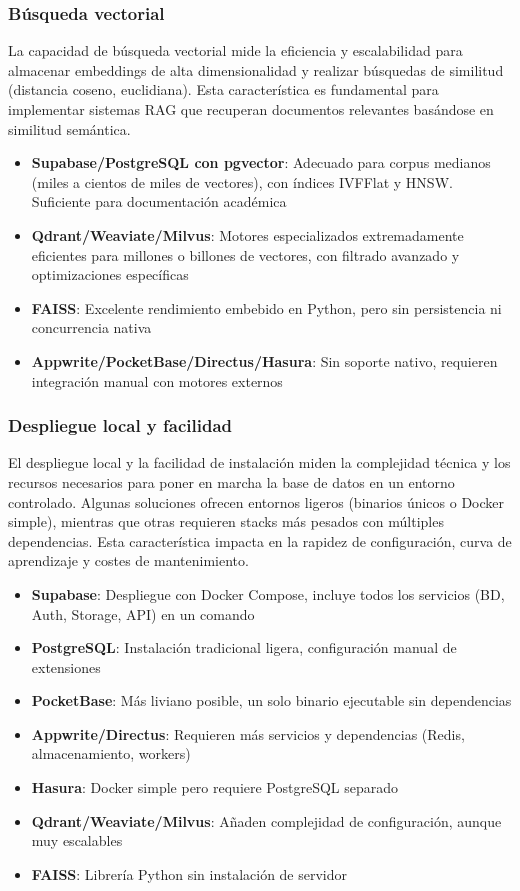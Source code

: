 \subsubsection{Búsqueda vectorial}

La capacidad de búsqueda vectorial mide la eficiencia y escalabilidad para almacenar embeddings de alta dimensionalidad y realizar búsquedas de similitud (distancia coseno, euclidiana). Esta característica es fundamental para implementar sistemas RAG que recuperan documentos relevantes basándose en similitud semántica.

\begin{itemize}
    \item \textbf{Supabase/PostgreSQL con pgvector}: Adecuado para corpus medianos (miles a cientos de miles de vectores), con índices IVFFlat y HNSW. Suficiente para documentación académica
    \item \textbf{Qdrant/Weaviate/Milvus}: Motores especializados extremadamente eficientes para millones o billones de vectores, con filtrado avanzado y optimizaciones específicas
    \item \textbf{FAISS}: Excelente rendimiento embebido en Python, pero sin persistencia ni concurrencia nativa
    \item \textbf{Appwrite/PocketBase/Directus/Hasura}: Sin soporte nativo, requieren integración manual con motores externos
\end{itemize}

\subsubsection{Despliegue local y facilidad}

El despliegue local y la facilidad de instalación miden la complejidad técnica y los recursos necesarios para poner en marcha la base de datos en un entorno controlado. Algunas soluciones ofrecen entornos ligeros (binarios únicos o Docker simple), mientras que otras requieren stacks más pesados con múltiples dependencias. Esta característica impacta en la rapidez de configuración, curva de aprendizaje y costes de mantenimiento.

\begin{itemize}
    \item \textbf{Supabase}: Despliegue con Docker Compose, incluye todos los servicios (BD, Auth, Storage, API) en un comando
    \item \textbf{PostgreSQL}: Instalación tradicional ligera, configuración manual de extensiones
    \item \textbf{PocketBase}: Más liviano posible, un solo binario ejecutable sin dependencias
    \item \textbf{Appwrite/Directus}: Requieren más servicios y dependencias (Redis, almacenamiento, workers)
    \item \textbf{Hasura}: Docker simple pero requiere PostgreSQL separado
    \item \textbf{Qdrant/Weaviate/Milvus}: Añaden complejidad de configuración, aunque muy escalables
    \item \textbf{FAISS}: Librería Python sin instalación de servidor
\end{itemize}

